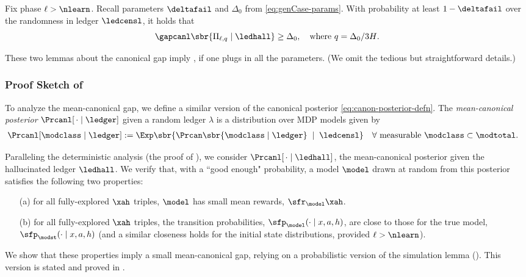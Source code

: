 \begin{lemma}\label{lemma:gap_bound_prob}
Fix phase $\ell > \nlearn$. Recall parameters $\deltafail$ and $\Delta_0$ from \eqref{eq:genCase-params}. With probability at least $1 - \deltafail$ over the randomness in ledger $\ledcensl$, it holds that
\[ \gapcanl\sbr{\Pi_{\ell,q} \mid \ledhall}
    \geq \Delta_0,
    \quad\text{where $q = \Delta_0/3H$}.\]
\end{lemma}

These two lemmas about the canonical gap imply , if one plugs in all the parameters. (We omit the tedious but straightforward details.)

\subsubsection*{Proof Sketch of }\label{ssec:sketch:lemma:gap_bound_prob}

To analyze the mean-canonical gap, we define a similar version of the canonical posterior \eqref{eq:canon-posterior-defn}. The \emph{mean-canonical posterior} $\Prcanl[\,\cdot\mid\ledger]$ given a random ledger $\lambda$ is a distribution over MDP models given by
\begin{align}\label{eq:hal-posterior-defn}
\Prcanl[\modclass \mid\ledger]
    &:= \Exp\sbr{ \Prcan\sbr{ \modclass \mid \ledger }
        \;\mid\; \ledcensl }
    \quad\forall \text{ measurable }\modclass\subset\modtotal.
\end{align}


Paralleling the deterministic analysis (\ie the proof of ), we consider
    $\Prcanl[\,\cdot \mid\ledhall]$,
the mean-canonical posterior given the hallucinated ledger $\ledhall$. We verify that, with a ``good enough" probability, a model $\model$ drawn at random from this posterior satisfies the following two properties:
\begin{itemize}
\item[(a)] for all fully-explored $\xah$ triples, $\model$ has small mean rewards, $\sfr_{\model}\xah$.
\item[(b)] for all fully-explored $\xah$ triples, the transition probabilities, $\sfp_{\model}(\cdot \mid x,a,h)$, are close to those for the true model, $\sfp_{\modst}(\cdot \mid x,a,h)$ (and a similar closeness holds for the initial state distributions, provided $\ell > \nlearn$).
\end{itemize}
We show that these properties imply a small mean-canonical gap, relying on a probabilistic version of the  simulation lemma (). This version is stated and proved in .


